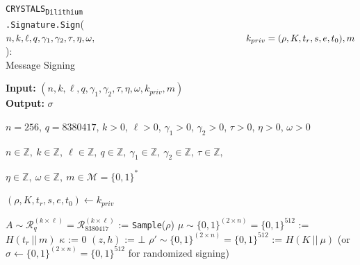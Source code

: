 \documentclass[runningheads]{llncs}
\numberwithin{equation}{section}
\begin{document}
    \begin{algorithm}
        \caption{\texorpdfstring{\texttt{CRYSTALS}\textsubscript{\texttt{Dilithium}}\\ \phantom{............................}\texttt{.Signature}\texttt{.Sign}($n, k, \ell, q, {\gamma}_{1}, {\gamma}_{2}, \tau, \eta, \omega,\\ \phantom{..........................................................}{k}_{priv} = (\rho, K, {t}_{r}, s, e, {t}_{0}), m$)}\/:\\ \phantom{...........................................................................................}Message Signing}
        \label{subrou:crystals-dilithium-sign}
        
        \textbf{Input:} $\left( n, k, \ell, q, {\gamma}_{1}, {\gamma}_{2}, \tau, \eta, \omega, {k}_{priv}, m \right)$\\
        \textbf{Output:} $ \sigma $
    
        \begin{algorithmic}[1]
            \Require $n = 256$, $q = 8380417$, $k > 0$, $\ell > 0$, ${\gamma}_{1} > 0$, ${\gamma}_{2} > 0$, $\tau > 0$, $\eta > 0$, $\omega > 0$
            \Ensure \begin{varwidth}[t]{\linewidth}$n \in \mathbb{Z},\ k \in \mathbb{Z},\ \ell \in \mathbb{Z},\ q \in \mathbb{Z},\ {\gamma}_{1} \in \mathbb{Z},\ {\gamma}_{2} \in \mathbb{Z},\ \tau \in \mathbb{Z},$ \par $ \eta \in \mathbb{Z},\ \omega \in \mathbb{Z},\ m \in \mathcal{M} = {\{0, 1\}}^{*}$ \end{varwidth}
            
            \vspace{2ex}

            \State $\left( \rho, K, {t}_{r}, s, e, {t}_{0} \right) \gets {k}_{priv}$
            
            \vspace{1ex}
            
            \State $A \sim {\mathcal{R}}_{q}^{( k \times \ell )} = {\mathcal{R}}_{8380417}^{( k \times \ell )}$ := \texttt{Sample}($\rho$)
            \State $\mu \sim { \{ 0 , 1 \} }^{( 2 \times n )} = { \{ 0 , 1 \} }^{512}$ := $H\left( {t}_{r}\ ||\ m \right)$
            \State $\kappa$ := $0$
            \State $(z, h)$ := $\bot$
            \State $\rho' \sim { \{ 0 , 1 \} }^{( 2 \times n )} = { \{ 0 , 1 \} }^{512}$ := $H\left( K\ ||\ \mu \right)$ (or $\sigma \gets { \{ 0 , 1 \} }^{( 2 \times n )} = { \{ 0 , 1 \} }^{512}$ 
            \Statex \hspace{44ex} for randomized signing)
            

\end{algorithmic}
\end{algorithm}
\end{document}
